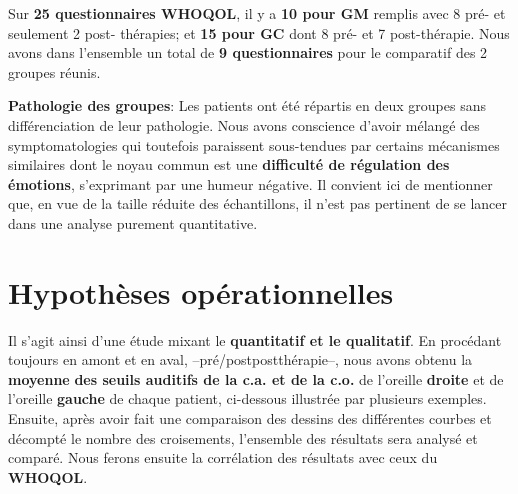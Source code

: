 Sur \textbf{25 questionnaires WHOQOL}, il y a \textbf{10 pour GM} remplis
avec 8 pré- et seulement 2
     post- thérapies; et \textbf{15 pour GC} dont 8 pré-
     et 7 post-thérapie.
      Nous avons dans l'ensemble un total de \textbf{9 questionnaires} pour le
     comparatif des 2 groupes réunis.
    
\textbf{ Pathologie des groupes}: Les patients ont été répartis en deux groupes sans différenciation de
 leur pathologie. Nous avons conscience d'avoir mélangé des symptomatologies qui
 toutefois paraissent
 sous-tendues par
                                               certains mécanismes
                                               similaires dont le
                                               noyau commun est une
                                              \textbf{difficulté de
                                               régulation des
                                               émotions}, 
                                               s'exprimant par une
                                               humeur négative.
                                               Il convient ici de mentionner que, en vue de la taille réduite des échantillons, il n'est pas
pertinent de se lancer dans une analyse purement
quantitative.

\section{Hypothèses opérationnelles}

Il s'agit ainsi d'une étude mixant le \textbf{quantitatif  et le
  qualitatif}.
En procédant toujours en amont et en aval, --pré/postpostthérapie--, nous
avons obtenu la \textbf{moyenne} \textbf{des seuils
auditifs de la c.a. et de la c.o.} de l'oreille \textbf{droite} et de
l'oreille \textbf{gauche} de chaque patient, ci-dessous illustrée par
plusieurs exemples. Ensuite, après avoir 
fait une comparaison des dessins des différentes courbes et
décompté le nombre des croisements, l'ensemble des résultats sera analysé et comparé.
Nous ferons ensuite la corrélation des résultats avec ceux du\textbf{
  WHOQOL}.

